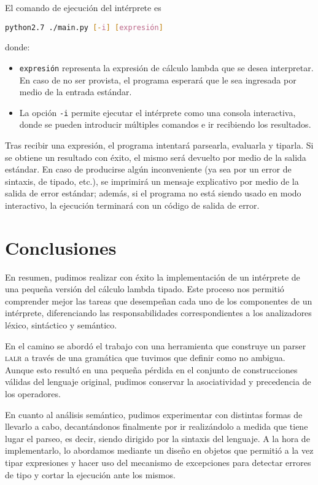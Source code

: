 \documentclass[11pt]{article}
\begin{document}
El comando de ejecución del intérprete es
\begin{center}\lstinline[language=bash]
	{python2.7 ./main.py [-i] [expresión]}
\end{center}
\noindent donde:

\begin{itemize}
\item \verb|expresión| representa la expresión de cálculo lambda que se
	desea interpretar. En caso de no ser provista, el programa esperará que le
    sea ingresada por medio de la entrada estándar.
\item La opción \verb|-i| permite ejecutar el intérprete como una consola
	interactiva, donde se pueden introducir múltiples comandos e ir recibiendo
    los resultados.
\end{itemize}

Tras recibir una expresión, el programa intentará parsearla, evaluarla y
tiparla. Si se obtiene un resultado con éxito, el mismo será devuelto por
medio de la salida estándar. En caso de producirse algún inconveniente
(ya sea por un error de sintaxis, de tipado, etc.), se imprimirá un mensaje
explicativo por medio de la salida de error estándar; además, si el programa
no está siendo usado en modo interactivo, la ejecución terminará con un código
de salida de error.


\section{Conclusiones}
En resumen, pudimos realizar con éxito la implementación de un intérprete de
una pequeña versión del cálculo lambda tipado. Este proceso nos permitió
comprender mejor las tareas que desempeñan cada uno de los componentes de un
intérprete, diferenciando las responsabilidades correspondientes a los
analizadores léxico, sintáctico y semántico.

En el camino se abordó el trabajo con una herramienta que construye un parser \textsc{lalr} a través de una gramática que tuvimos que definir como no ambigua. Aunque esto resultó en una pequeña pérdida en el conjunto de construcciones válidas del lenguaje original, pudimos conservar la asociatividad y precedencia de los operadores.

En cuanto al análisis semántico, pudimos experimentar con distintas formas
de llevarlo a cabo, decantándonos finalmente por ir realizándolo a medida
que tiene lugar el parseo, es decir, siendo dirigido por la sintaxis del
lenguaje. A la hora de implementarlo, lo abordamos mediante un diseño en objetos que permitió a la vez tipar expresiones y hacer uso del mecanismo de excepciones para detectar errores de tipo y cortar la ejecución ante los mismos.
\end{document}
